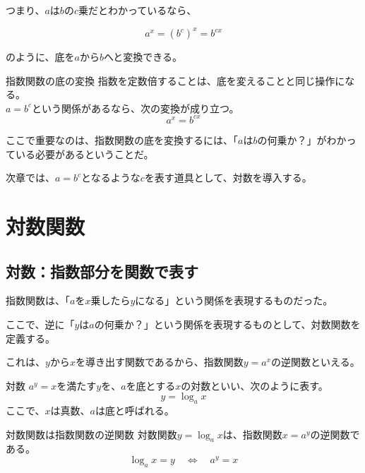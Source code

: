 \documentclass[../math-imaging]{subfiles}
\begin{document}
つまり、$a$は$b$の$c$乗だとわかっているなら、

\begin{equation}
  a^x = (b^c)^x = b^{cx}
\end{equation}

のように、底を$a$から$b$へと変換できる。

\begin{theorem}{指数関数の底の変換}
  \newline
  指数を定数倍することは、底を変えることと同じ操作になる。\\
  $a = b^c$という関係があるなら、次の変換が成り立つ。
  \LARGE
  \begin{equation}
    a^x = b^{cx}
  \end{equation}
\end{theorem}

ここで重要なのは、指数関数の底を変換するには、「$a$は$b$の何乗か？」がわかっている必要があるということだ。

次章では、$a = b^c$となるような$c$を表す道具として、対数を導入する。

\section{対数関数}

\subsection{対数：指数部分を関数で表す}

指数関数は、「$a$を$x$乗したら$y$になる」という関係を表現するものだった。

ここで、逆に「$y$は$a$の何乗か？」という関係を表現するものとして、対数関数を定義する。

これは、$y$から$x$を導き出す関数であるから、指数関数$y=a^x$の逆関数といえる。

\begin{definition}{対数}
  \newline
  $a^y = x$を満たす$y$を、$a$を底とする$x$の対数といい、次のように表す。
  \LARGE
  \begin{equation}
    y = \log_a x
  \end{equation}
  \normalsize
  ここで、$x$は真数、$a$は底と呼ばれる。
\end{definition}

\begin{definition}{対数関数は指数関数の逆関数}
  \newline
  対数関数$y=\log_a x$は、指数関数$x = a^y$の逆関数である。
  \LARGE
  \begin{equation}
    \log_a x = y \quad \Longleftrightarrow  \quad a^y = x
  \end{equation}
\end{definition}
\end{document}
